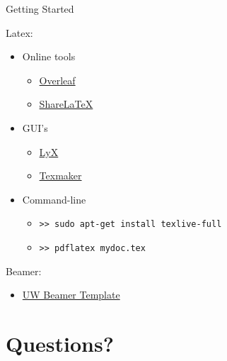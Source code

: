 \documentclass[12pt]{beamer}
\begin{document}
\begin{frame}{Getting Started}

Latex:
\begin{itemize}
\item{Online tools}
\begin{itemize}
\item \href{https://www.overleaf.com/}{Overleaf }
\item \href{https://www.sharelatex.com/}{ShareLaTeX }
\end{itemize}

\item{GUI's}
\begin{itemize}
\item \href{http://www.lyx.org/}{LyX }
\item \href{http://www.xm1math.net/texmaker/}{Texmaker }
\end{itemize}

\item{Command-line}
\begin{itemize}
\item \texttt{>> sudo apt-get install texlive-full}
\item \texttt{>> pdflatex mydoc.tex}
\end{itemize}

\end{itemize}
Beamer:
\begin{itemize}
\item \href{https://github.com/travitch/uw-beamer-template}{UW Beamer Template }
\end{itemize}

\end{frame}
\section*{Questions?}
\end{document}
